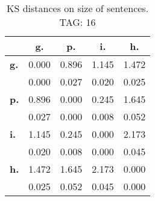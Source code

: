 \begin{table}[h!]
\begin{center}
\begin{tabular}{| l || c | c | c | c |}\hline
 & {\bf g.} & {\bf p.} & {\bf i.} & {\bf h.} \\\hline\hline
{\bf g.} & 0.000 & 0.896 & 1.145 & 1.472 \\
{\bf } & 0.000 & 0.027 & 0.020 & 0.025 \\\hline
{\bf p.} & 0.896 & 0.000 & 0.245 & 1.645 \\
{\bf } & 0.027 & 0.000 & 0.008 & 0.052 \\\hline
{\bf i.} & 1.145 & 0.245 & 0.000 & 2.173 \\
{\bf } & 0.020 & 0.008 & 0.000 & 0.045 \\\hline
{\bf h.} & 1.472 & 1.645 & 2.173 & 0.000 \\
{\bf } & 0.025 & 0.052 & 0.045 & 0.000 \\\hline
\end{tabular}
\caption{KS distances on size of sentences. TAG: 16}
\end{center}
\end{table}